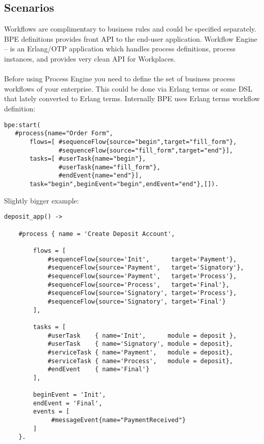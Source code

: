 \subsection{Scenarios}
Workflows are complimentary to business rules and could be specified separately.
BPE definitions provides front API to the end-user application.
Workflow Engine -- is an Erlang/OTP application which handles process definitions,
process instances, and provides very clean API for Workplaces.

\paragraph{}
Before using Process Engine you need to define the set of business process
workflows of your enterprise. This could be done via Erlang terms or some DSL
that lately converted to Erlang terms. Internally BPE uses Erlang terms
workflow definition:

\vspace{1\baselineskip}
\begin{lstlisting}
bpe:start(
   #process{name="Order Form",
       flows=[ #sequenceFlow{source="begin",target="fill_form"},
               #sequenceFlow{source="fill_form",target="end"}],
       tasks=[ #userTask{name="begin"},
               #userTask{name="fill_form"},
               #endEvent{name="end"}],
       task="begin",beginEvent="begin",endEvent="end"},[]).
\end{lstlisting}


\newpage
Slightly bigger example:

\vspace{1\baselineskip}
\begin{lstlisting}
deposit_app() ->

    #process { name = 'Create Deposit Account',

        flows = [
            #sequenceFlow{source='Init',      target='Payment'},
            #sequenceFlow{source='Payment',   target='Signatory'},
            #sequenceFlow{source='Payment',   target='Process'},
            #sequenceFlow{source='Process',   target='Final'},
            #sequenceFlow{source='Signatory', target='Process'},
            #sequenceFlow{source='Signatory', target='Final'}
        ],

        tasks = [
            #userTask    { name='Init',      module = deposit },
            #userTask    { name='Signatory', module = deposit},
            #serviceTask { name='Payment',   module = deposit},
            #serviceTask { name='Process',   module = deposit},
            #endEvent    { name='Final'}
        ],

        beginEvent = 'Init',
        endEvent = 'Final',
        events = [
             #messageEvent{name="PaymentReceived"}
        ]
    }.
\end{lstlisting}

